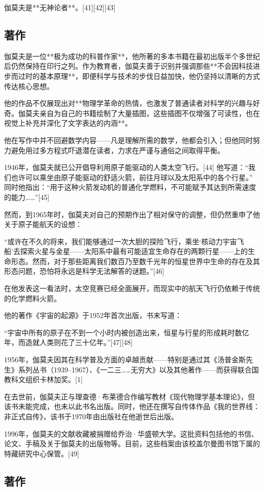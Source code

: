 伽莫夫是**无神论者**。[41][42][43]
\subsection{著作}
伽莫夫是一位**极为成功的科普作家**，他所著的多本书籍在最初出版半个多世纪后仍然保持在印行之列。作为教育者，伽莫夫善于识别并强调那些**不会因科技进步而过时的基本原理**，即便科学与技术的步伐日益加快，他仍坚持以清晰的方式传达核心思想。

他的作品不仅展现出对**物理学革命的热情，也激发了普通读者对科学的兴趣与好奇。伽莫夫亲自为自己的书籍绘制了大量插图，这些插图不仅增强了可读性，也在视觉上补充并深化了文字表达的内涵**。

他在写作中并不回避数学内容——凡是理解所需的数学，他都会引入；但他同时努力避免用过多方程式吓退潜在读者，力求在严谨与通俗之间取得平衡。

1946年，伽莫夫就已公开倡导利用原子能驱动的人类太空飞行。[44]
他写道：“我们也许可以乘坐由原子能驱动的舒适火箭，前往月球以及太阳系中的各个行星。”
同时他指出：“用于这种火箭发动机的普通化学燃料，不可能赋予其达到所需速度的能力……”[45]

然而，到1965年时，伽莫夫对自己的预期作出了相对保守的调整，但仍然重申了他关于原子能航天的设想：

“或许在不久的将来，我们能够通过一次大胆的探险飞行，乘坐‘核动力宇宙飞船’去探索火星与金星——太阳系中最有可能适宜生命存在的两颗行星——上的生命形态。然而，对于那些距离我们数百乃至数千光年的恒星世界中生命的存在及其形态问题，恐怕将永远是科学无法解答的谜题。”[46]

在他发表这一看法时，太空竞赛已经全面展开，而现实中的航天飞行仍依赖于传统的化学燃料火箭。

他的著作《宇宙的起源》于1952年首次出版，书末写道：

“宇宙中所有的原子在不到一个小时内被创造出来，恒星与行星的形成耗时数亿年，而造就人类则花了三十亿年。”[47][48]

1956年，伽莫夫因其在科学普及方面的卓越贡献——特别是通过其《汤普金斯先生》系列丛书（1939–1967）、《一二三……无穷大》以及其他著作——而获得联合国教科文组织卡林加奖。[1]

在去世前，伽莫夫正与理查德·布莱德合作编写教材《现代物理学基本理论》，但该书未能完成，也未以此书名出版。同时，他还在撰写自传体作品《我的世界线：非正式自传》，该书于1970年由出版社在他逝世后出版。

1996年，伽莫夫的文献收藏被捐赠给乔治·华盛顿大学。这批资料包括他的书信、论文、手稿及关于伽莫夫的出版物等。目前，这些档案由该校盖尔曼图书馆下属的特藏研究中心保管。[49]
\subsection{著作}
